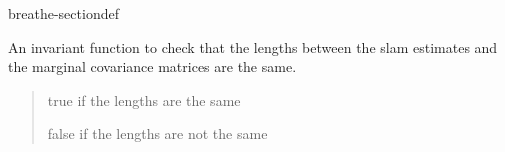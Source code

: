 \documentclass[letterpaper,10pt,english]{sphinxmanual}
\begin{document}
\begin{fulllineitems}
\begin{sphinxuseclass}{breathe-sectiondef}
\begin{fulllineitems}
\begin{quote}
\begin{description}
\end{description}\end{quote}

\end{fulllineitems}


\begin{fulllineitems}
\label{\detokenize{isam2:_CPPv4N4slam14SLAMEstAndMCov13check_lengthsEv}}\label{\detokenize{isam2:_CPPv3N4slam14SLAMEstAndMCov13check_lengthsEv}}\label{\detokenize{isam2:_CPPv2N4slam14SLAMEstAndMCov13check_lengthsEv}}\label{\detokenize{isam2:slam::SLAMEstAndMCov::check_lengths}}
\pysigstartsignatures
\pysigstartmultiline
\pysiglinewithargsret
{\label{\detokenize{isam2:classslam_1_1SLAMEstAndMCov_1a88f032ececf587581276cb1e7022a689}}}
{}
{}
\pysigstopmultiline
\pysigstopsignatures
\sphinxAtStartPar
An invariant function to check that the lengths between the slam estimates and the marginal covariance matrices are the same. 
\begin{quote}\begin{description}
\sphinxAtStartPar
true if the lengths are the same 

\sphinxAtStartPar
false if the lengths are not the same 

\end{description}\end{quote}

\end{fulllineitems}



\end{sphinxuseclass}
\end{fulllineitems}
\end{document}
